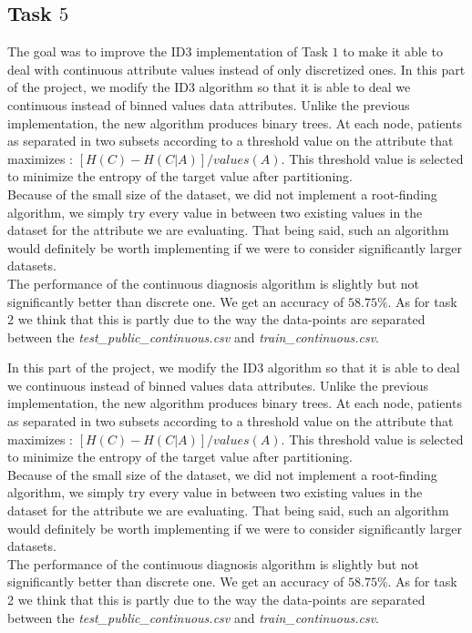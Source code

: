 \documentclass[9pt]{extarticle}
\begin{document}
\subsection{Task $5$}
The goal was to improve the ID3 implementation of Task $1$ to make it able to deal with continuous attribute values instead of only discretized ones.
In this part of the project, we modify the ID3 algorithm so that it is able to deal we continuous instead of binned values data attributes. Unlike the previous implementation, the new algorithm produces binary trees. At each node, patients as separated in two subsets according to a threshold value on the attribute that maximizes : $[H(C) - H(C|A)] / {values(A)}$. This threshold value is selected to minimize the entropy of the target value after partitioning. \\
Because of the small size of the dataset, we did not implement a root-finding algorithm, we simply try every value in between two existing values in the dataset for the attribute we are evaluating. That being said, such an algorithm would definitely be worth implementing if we were to consider significantly larger datasets. \\
The performance of the continuous diagnosis algorithm is slightly but not significantly better than discrete one. We get an accuracy of $58.75\%$. As for task 2 we think that this is partly due to the way the data-points are separated between the \emph{test\_public\_continuous.csv} and \emph{train\_continuous.csv}. 

In this part of the project, we modify the ID3 algorithm so that it is able to deal we continuous instead of binned values data attributes. Unlike the previous implementation, the new algorithm produces binary trees. At each node, patients as separated in two subsets according to a threshold value on the attribute that maximizes : $[H(C) - H(C|A)] / {values(A)}$. This threshold value is selected to minimize the entropy of the target value after partitioning. \\
Because of the small size of the dataset, we did not implement a root-finding algorithm, we simply try every value in between two existing values in the dataset for the attribute we are evaluating. That being said, such an algorithm would definitely be worth implementing if we were to consider significantly larger datasets. \\
The performance of the continuous diagnosis algorithm is slightly but not significantly better than discrete one. We get an accuracy of $58.75\%$. As for task 2 we think that this is partly due to the way the data-points are separated between the \emph{test\_public\_continuous.csv} and \emph{train\_continuous.csv}. 
\end{document}
